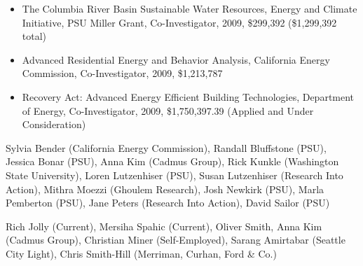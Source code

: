 \documentclass[times,12pt]{article} %
\begin{document}
\begin{itemize}
 \item The Columbia River Basin Sustainable Water Resources, Energy and Climate Initiative,  PSU Miller Grant, Co-Investigator, 2009, \$299,392 (\$1,299,392 total)

 \item Advanced Residential Energy and Behavior Analysis, California Energy Commission, Co-Investigator, 2009, \$1,213,787


 \item Recovery Act: Advanced Energy Efficient Building Technologies, Department of Energy, Co-Investigator, 2009, \$1,750,397.39 (Applied and Under Consideration)



\end{itemize}



Sylvia Bender (California Energy Commission), Randall Bluffstone (PSU), Jessica Bonar (PSU), Anna Kim (Cadmus Group), Rick Kunkle (Washington State University), Loren Lutzenhiser (PSU), Susan Lutzenhiser (Research Into Action), Mithra Moezzi (Ghoulem Research), Josh Newkirk (PSU), Marla Pemberton  (PSU), Jane Peters  (Research Into Action), David Sailor (PSU)


Rich Jolly (Current), Mersiha Spahic (Current), Oliver Smith, Anna Kim (Cadmus Group), Christian Miner (Self-Employed), Sarang Amirtabar (Seattle City Light), Chris Smith-Hill (Merriman, Curhan, Ford \& Co.)
\end{document}
